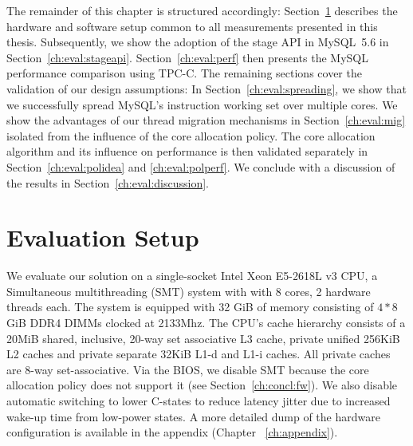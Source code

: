 \documentclass[12pt,a4paper]{book}
\begin{document}
The remainder of this chapter is structured accordingly:
Section~\ref{ch:eval:setup} describes the hardware and software setup common to all measurements presented in this thesis.
Subsequently, we show the adoption of the stage API in MySQL~5.6 in Section~\ref{ch:eval:stageapi}.
Section~\ref{ch:eval:perf} then presents the MySQL performance comparison using TPC-C.
The remaining sections cover the validation of our design assumptions:
In Section~\ref{ch:eval:spreading}, we show that we successfully spread MySQL's instruction working set over multiple cores.
We show the advantages of our thread migration mechanisms in Section~\ref{ch:eval:mig} isolated from the influence of the core allocation policy.
The core allocation algorithm and its influence on performance is then validated separately in Section~\ref{ch:eval:polidea} and \ref{ch:eval:polperf}.
We conclude with a discussion of the results in Section~\ref{ch:eval:discussion}.

\clearpage
\section{Evaluation Setup}\label{ch:eval:setup}
% 




We evaluate our solution on a single-socket Intel Xeon E5-2618L v3 CPU, a Simultaneous multithreading (SMT) system with with 8 cores, 2 hardware threads each.
The system is equipped with 32 GiB of memory consisting of $4*8$ GiB DDR4 DIMMs clocked at 2133Mhz.
The CPU's cache hierarchy consists of a 20MiB shared, inclusive, 20-way set associative L3 cache, private unified 256KiB L2 caches and private separate 32KiB L1-d and L1-i caches.
All private caches are 8-way set-associative.
Via the BIOS, we disable SMT because the core allocation policy does not support it (see Section~\ref{ch:concl:fw}).
We also disable automatic switching to lower C-states to reduce latency jitter due to increased wake-up time from low-power states.
A more detailed dump of the hardware configuration is available in the appendix (Chapter ~\ref{ch:appendix}).
\end{document}
